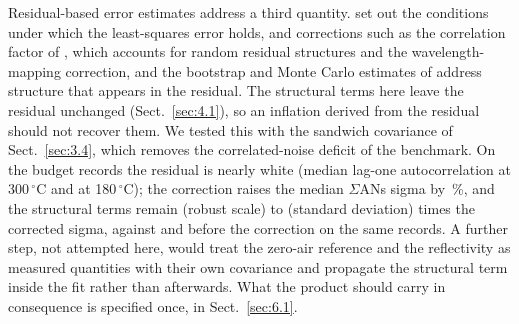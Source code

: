 Residual-based error estimates address a third quantity. \citet{Platt} set out the conditions under which the
least-squares error holds, and corrections such as the correlation factor of \citet{Stutz_1996}, which accounts for
random residual structures and the wavelength-mapping correction, and the bootstrap and Monte Carlo estimates of
\citet{Hausmann_1999} address structure that appears in the residual. The structural terms here leave the residual
unchanged (Sect.~\ref{sec:4.1}), so an inflation derived from the residual should not recover them. We tested this with
the sandwich covariance of Sect.~\ref{sec:3.4}, which removes the correlated-noise deficit of the benchmark. On the budget
records the residual is nearly white (median lag-one autocorrelation  at 300\,$^{\circ}$C and  at
180\,$^{\circ}$C); the correction raises the median $\Sigma$ANs sigma by \,\%, and the structural terms remain  (robust
scale) to  (standard deviation) times the corrected sigma, against  and  before the correction on
the same records. A further step, not attempted here, would treat the zero-air reference and the reflectivity as
measured quantities with their own covariance and propagate the structural term inside the fit rather than
afterwards. What the product should carry in consequence is specified once, in Sect.~\ref{sec:6.1}.
